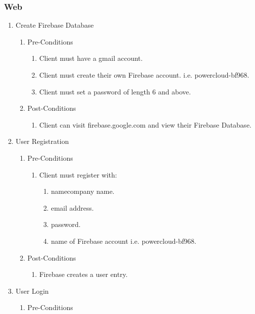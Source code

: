 \documentclass{article}
\begin{document}
	\subsubsection{Web}
	\begin{enumerate}
		\item	Create Firebase Database
		\begin{enumerate}
			\item  Pre-Conditions
			\begin{enumerate}
				\item	Client must have a gmail account.
				\item	Client must create their own Firebase account. i.e. powercloud-bf968.
				\item	Client must set a password of length 6 and above.
			\end{enumerate}
			\item  Post-Conditions		
			\begin{enumerate}
				\item	Client can visit firebase.google.com and view their Firebase Database.
			\end{enumerate}
		\end{enumerate}
		\item	User Registration
		\begin{enumerate}
			\item  Pre-Conditions
			\begin{enumerate}
				\item	Client must register with:
				\begin{enumerate}
					\item	namecompany name.
					\item	email address.
					\item	password.
					\item	name of Firebase account i.e. powercloud-bf968.
				\end{enumerate}
			\end{enumerate}
			\item  Post-Conditions		
			\begin{enumerate}
				\item	Firebase creates a user entry.
			\end{enumerate}
		\end{enumerate}
		\item	User Login
		\begin{enumerate}
			\item  Pre-Conditions
			\begin{enumerate}

\end{enumerate}
\end{enumerate}
\end{enumerate}
\end{document}
